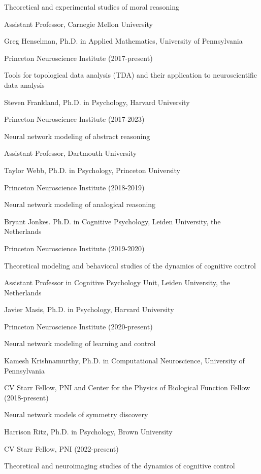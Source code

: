 \documentclass[10 pt]{article}
\begin{document}
Theoretical and experimental studies of moral reasoning

Assistant Professor, Carnegie Mellon University
    \medskip

Greg Henselman, Ph.D. in Applied Mathematics, University of Pennsylvania

Princeton Neuroscience Institute (2017-present)

Tools for topological data analysis (TDA) and their application to neuroscientific data analysis
    \medskip

Steven Frankland, Ph.D. in Psychology, Harvard University

Princeton Neuroscience Institute (2017-2023)

Neural network modeling of abstract reasoning

Assistant Professor, Dartmouth University
    \medskip

Taylor Webb, Ph.D. in Psychology, Princeton University

Princeton Neuroscience Institute (2018-2019)

Neural network modeling of analogical reasoning
    \medskip

Bryant Jonkes. Ph.D. in Cognitive Psychology, Leiden University, the Netherlands

Princeton Neuroscience Institute (2019-2020)

Theoretical modeling and behavioral studies of the dynamics of cognitive control

Assistant Professor in Cognitive Psychology Unit, Leiden University, the Netherlands
    \medskip


Javier Masis, Ph.D. in Psychology, Harvard University

Princeton Neuroscience Institute (2020-present)


Neural network modeling of learning and control
    \medskip

Kamesh Krishnamurthy, Ph.D. in Computational Neuroscience, University of Pennsylvania

CV Starr Fellow, PNI and Center for the Physics of Biological Function Fellow (2018-present)

Neural network models of symmetry discovery
    \medskip

Harrison Ritz, Ph.D. in Psychology, Brown University

CV Starr Fellow, PNI (2022-present)

Theoretical and neuroimaging studies of the dynamics of cognitive control
    \medskip
\end{document}
